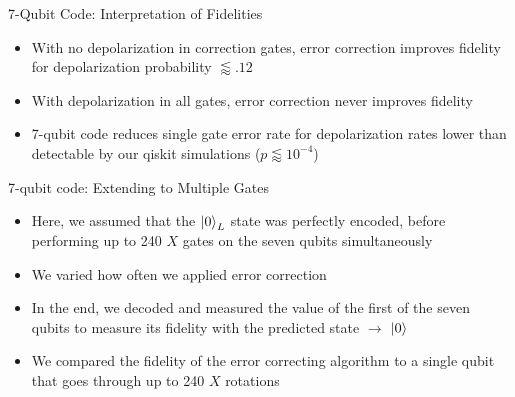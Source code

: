 \documentclass{beamer}
\begin{document}
\begin{frame}{7-Qubit Code: Interpretation of Fidelities}
  \begin{itemize}
  \item With no depolarization in correction gates, error correction improves fidelity for depolarization probability $\lessapprox .12$
  \item With depolarization in all gates, error correction never improves fidelity
    \pause
  \item 7-qubit code reduces single gate error rate for depolarization rates lower than detectable by our qiskit simulations ($p\lessapprox 10^{-4}$)
  \end{itemize}
\end{frame}

\begin{frame}{7-qubit code: Extending to Multiple Gates}
    \begin{itemize}
        \item  Here, we assumed that the $\left\vert{0}\right\rangle_L$ state was perfectly encoded, before performing up to 240 $X$ gates on the seven qubits simultaneously
        \item We varied how often we applied error correction
        \item  In the end, we decoded and  measured the value of the first of the seven qubits to measure its fidelity with the predicted state $\rightarrow$  $\left\vert{0}\right\rangle$
        \item We compared the fidelity of the error correcting algorithm to a single qubit that goes through up to 240 $X$ rotations
    \end{itemize}
\end{frame}
\end{document}
